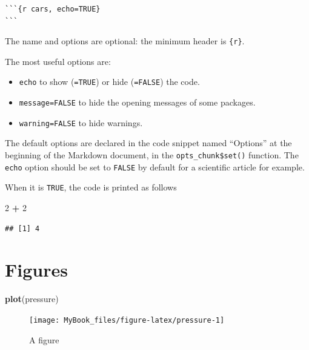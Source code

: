 \documentclass[
  12pt,
  american,
  a4paper,
  extrafontsizes,onecolumn,openright
  ]{memoir}
\newenvironment{Shaded}{\begin{snugshade}}{\end{snugshade}}
\newcommand{\DecValTok}[1]{\textcolor[rgb]{0.00,0.00,0.81}{#1}}
\newcommand{\FunctionTok}[1]{\textcolor[rgb]{0.13,0.29,0.53}{\textbf{#1}}}
\newcommand{\NormalTok}[1]{#1}
\newcommand{\SpecialCharTok}[1]{\textcolor[rgb]{0.81,0.36,0.00}{\textbf{#1}}}
\providecommand{\tightlist}{%
  \setlength{\itemsep}{0pt}\setlength{\parskip}{0pt}}
\begin{document}
\begin{verbatim}
```{r cars, echo=TRUE}
```
\end{verbatim}

The name and options are optional: the minimum header is \texttt{\{r\}}.

The most useful options are:

\begin{itemize}
\tightlist
\item
  \texttt{echo} to show (\texttt{=TRUE}) or hide (\texttt{=FALSE}) the code.
\item
  \texttt{message=FALSE} to hide the opening messages of some packages.
\item
  \texttt{warning=FALSE} to hide warnings.
\end{itemize}

The default options are declared in the code snippet named \enquote{Options} at the beginning of the Markdown document, in the \texttt{opts\_chunk\$set()} function.
The \texttt{echo} option should be set to \texttt{FALSE} by default for a scientific article for example.

When it is \texttt{TRUE}, the code is printed as follows

\scriptsize

\begin{Shaded}
\begin{Highlighting}[]
\DecValTok{2} \SpecialCharTok{+} \DecValTok{2}
\end{Highlighting}
\end{Shaded}

\begin{verbatim}
## [1] 4
\end{verbatim}

\normalsize

\section{Figures}\label{figures}

\scriptsize

\begin{Shaded}
\begin{Highlighting}[]
\FunctionTok{plot}\NormalTok{(pressure)}
\end{Highlighting}
\end{Shaded}

\begin{figure}

{\centering \texttt{[image: MyBook\_files/figure-latex/pressure-1]} 

}

\caption{A figure}\label{fig:pressure}
\end{figure}
\end{document}
